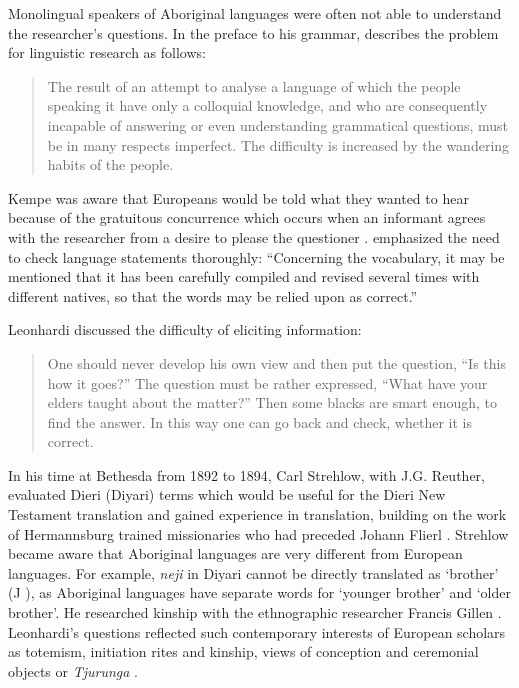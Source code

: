 \documentclass[english,output=paper,colorlinks,citecolor=brown]{../langscibook}
\begin{document}
Monolingual speakers of Aboriginal languages were often not able to understand the researcher’s questions. In the preface to his grammar, \citet[1]{Kempe1891} describes the problem for linguistic research as follows: 

\begin{quote}
    The result of an attempt to analyse a language of which the people speaking it have only a colloquial knowledge, and who are consequently incapable of answering or even understanding grammatical questions, must be in many respects imperfect. The difficulty is increased by the wandering habits of the people. 
\end{quote}

Kempe was aware that Europeans would be told what they wanted to hear because of the gratuitous concurrence which occurs when an informant agrees with the researcher from a desire to please the questioner \citep[198]{Liberman1985}. \citet[1]{Kempe1891} emphasized the need to check language statements thoroughly: “Concerning the vocabulary, it may be mentioned that it has been carefully compiled and revised several times with different natives, so that the words may be relied upon as correct.” 

Leonhardi discussed the difficulty of eliciting information:

\begin{quote}
    One should never develop his own view and then put the question, “Is this how it goes?” The question must be rather expressed, “What have your elders taught about the matter?” Then some blacks are smart enough, to find the answer. In this way one can go back and check, whether it is correct. \citep[286]{Leonhardi1907}
\end{quote}

In his time at Bethesda from 1892 to 1894, Carl Strehlow, with J.G. Reuther, evaluated Dieri (Diyari) terms which would be useful for the Dieri New Testament translation and gained experience in translation, building on the work of Hermannsburg trained missionaries who had preceded Johann Flierl \citep{Kneebone2001}. Strehlow became aware that Aboriginal languages are very different from European languages. For example, \textit{neji} in Diyari cannot be directly translated as ‘brother’ (J \citealt[83]{Strehlow2011}), as Aboriginal languages have separate words for ‘younger brother’ and ‘older brother’. He researched kinship with the ethnographic researcher Francis Gillen \citep{MulvaneyEtAl1997}. Leonhardi’s questions reflected such contemporary interests of European scholars as totemism, initiation rites and kinship, views of conception and ceremonial objects or \textit{Tjurunga} \citep{Schmidt1908}. 
\end{document}

